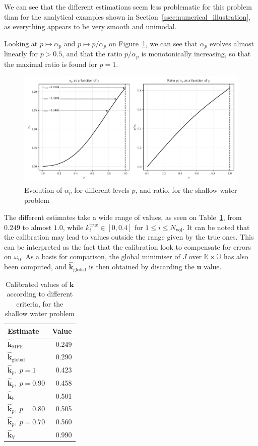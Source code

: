 \documentclass[preprint, review, 1p]{elsarticle}
\newcommand{\Ex}{\mathbb{E}}
\newcommand{\hatkmean}{\hat{\mathbf{k}}_{\Ex}}
\newcommand{\hatkvar}{\hat{\mathbf{k}}_{\mathbb{V}}}
\newcommand{\hatkmpe}{\hat{\mathbf{k}}_{\mathrm{MPE}}}
\newcommand{\kest}{\hat{\mathbf{k}}}
\newcommand{\hatkp}{\hat{\mathbf{k}}_p}
\newcommand{\Kspace}{\mathbb{K}}
\newcommand{\Uspace}{\mathbb{U}}
\newlength{\onehalfcolumn}
\begin{document}
We can see that the different estimations seem less problematic for this problem than for the analytical examples shown in Section~\ref{ssec:numerical_illustration}, as everything appears to be very smooth and unimodal.

Looking at $p\mapsto \alpha_p$ and $p\mapsto p/\alpha_p$ on Figure~\ref{fig:alpha_p_SWE}, we can see that $\alpha_p$ evolves almost linearly for $p>0.5$, and that the ratio $p/\alpha_p$ is monotonically increasing, so that the maximal ratio is found for $p=1$.  

\begin{figure}[!h]
  \centering
  \includegraphics[width=\onehalfcolumn]{Figures/FIG11}
  \caption{Evolution of $\alpha_p$ for different levels $p$, and ratio, for the shallow water problem}
\label{fig:alpha_p_SWE}
\end{figure}

The different estimates take a wide range of values, as seen on Table~\ref{tab:recap_estimates_metaSWE}, from $0.249$ to almost $1.0$, while $k_i^{\mathrm{true}} \in [0, 0.4]$ for $1\leq i \leq N_{\mathrm{vol}}$. It can be noted that the calibration may lead to values outside the range given by the true ones. This can be interpreted as the fact that the calibration look to compensate for errors on $\omega_0$. 
As a basis for comparison, the global minimiser of $J$ over $\Kspace \times \Uspace$ has also been computed, and $\kest_{\mathrm{global}}$ is then obtained by discarding the $\mathbf{u}$ value.



\begin{table}[!h]
\centering
\caption{Calibrated values of $\mathbf{k}$ according to different criteria, for the shallow water problem}
\begin{tabular}{lr} \toprule
Estimate & Value \\ \midrule
$\hatkmpe$ & 0.249 \\
$\kest_{\mathrm{global}}$ & 0.290 \\
$\hatkp,~p=1$ & 0.423 \\ 
$\hatkp,~p=0.90$ & 0.458 \\ 
$\hatkmean$ & 0.501 \\ 
$\hatkp,~p=0.80$ & 0.505 \\ 
$\hatkp,~p=0.70$ & 0.560 \\ 
$\hatkvar$ & 0.990\\ \bottomrule
\end{tabular}
\label{tab:recap_estimates_metaSWE}
\end{table}
\end{document}

